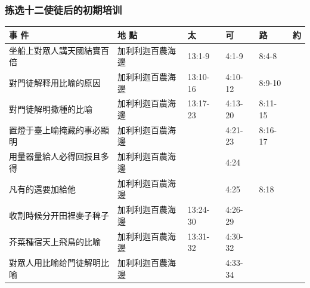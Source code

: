 \subsubsection{拣选十二使徒后的初期培训}
\begin{table}[H]
\centering 
\begin{tabular}{p{13.07em}|p{8.43em}|p{5.285em}|p{5.57em}|p{5.285em}|p{4.855em}}
\toprule
\textbf{事 件} & \textbf{地 點} & \textbf{太} & \textbf{可} & \textbf{路} & \textbf{約} \\\midrule

坐船上對眾人講天國結實百倍& 加利利迦百農海邊& \multicolumn{1}{l|}{13:1-9} & \multicolumn{1}{l|}{4:1-9} & 8:4-8 & \multicolumn{1}{r}{} \\ \midrule
對門徒解释用比喻的原因& 加利利迦百農海邊& \multicolumn{1}{l|}{13:10-16} & \multicolumn{1}{l|}{4:10-12} & 8:9-10 & \multicolumn{1}{r}{} \\ \midrule
對門徒解明撒種的比喻& 加利利迦百農海邊& \multicolumn{1}{l|}{13:17-23} & \multicolumn{1}{l|}{4:13-20} & 8:11-15 & \multicolumn{1}{r}{} \\ \midrule

置燈于臺上喻掩藏的事必顯明& 加利利迦百農海邊& \multicolumn{1}{l|}{} & \multicolumn{1}{l|}{4:21-23} & 8:16-17 & \multicolumn{1}{r}{} \\ \midrule

用量器量給人必得回报且多得& 加利利迦百農海邊& \multicolumn{1}{l|}{} & \multicolumn{1}{l|}{4:24} & & \multicolumn{1}{r}{} \\ \midrule

凡有的還要加給他& 加利利迦百農海邊& \multicolumn{1}{l|}{} & \multicolumn{1}{l|}{4:25} & 8:18& \multicolumn{1}{r}{} \\ \midrule

收割時候分开田裡麥子稗子& 加利利迦百農海邊& \multicolumn{1}{l|}{13:24-30} & \multicolumn{1}{l|}{4:26-29} & & \multicolumn{1}{r}{} \\ \midrule

芥菜種宿天上飛鳥的比喻& 加利利迦百農海邊& \multicolumn{1}{l|}{13:31-32} & \multicolumn{1}{l|}{4:30-32} & & \multicolumn{1}{r}{} \\ \midrule

對眾人用比喻给門徒解明比喻& 加利利迦百農海邊& \multicolumn{1}{l|}{} & \multicolumn{1}{l|}{4:33-34} & & \multicolumn{1}{r}{} \\ \midrule


\end{tabular}
\end{table}

